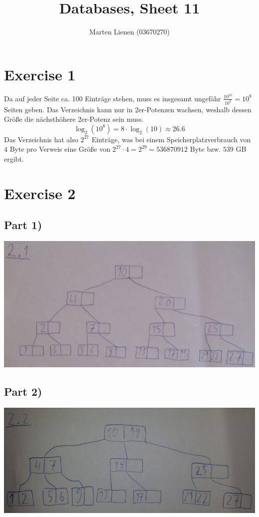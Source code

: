 \documentclass[10pt,a4paper]{article}
\title{Databases, Sheet 11}
\author{Marten Lienen (03670270)}
\begin{document}
\maketitle

\section*{Exercise 1}

Da auf jeder Seite ca. 100 Einträge stehen, muss es insgesamt ungefähr $\frac{10^{10}}{10^{2}} = 10^{8}$ Seiten geben.
Das Verzeichnis kann nur in 2er-Potenzen wachsen, weshalb dessen Größe die nächsthöhere 2er-Potenz sein muss.
\begin{equation*}
  \log_{2}(10^{8}) = 8 \cdot \log_{2}(10) \approx 26.6
\end{equation*}
Das Verzeichnis hat also $2^{27}$ Einträge, was bei einem Speicherplatzverbrauch von $4$ Byte pro Verweis eine Größe von $2^{27} \cdot 4 = 2^{29} = 536870912$ Byte bzw. $539$ GB ergibt.

\section*{Exercise 2}

\subsection*{Part 1)}

\includegraphics[width=\textwidth]{sheet-11/exercise-2-1}

\subsection*{Part 2)}

\includegraphics[width=\textwidth]{sheet-11/exercise-2-2}
\end{document}
